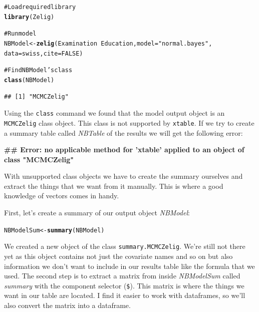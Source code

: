\documentclass[ChapterTOCs,krantz1]{krantz}\usepackage{graphicx, color}
\makeatletter
\newcommand{\hlfunctioncall}[1]{\textcolor[rgb]{0.501960784313725,0,0.329411764705882}{\textbf{#1}}}%
\newcommand{\hlstring}[1]{\textcolor[rgb]{0.6,0.6,1}{#1}}%
\newcommand{\hlcomment}[1]{\textcolor[rgb]{0.180392156862745,0.6,0.341176470588235}{#1}}%
\newenvironment{kframe}{%
 \def\at@end@of@kframe{}%
 \ifinner\ifhmode%
  \def\at@end@of@kframe{\end{minipage}}%
  \begin{minipage}{\columnwidth}%
 \fi\fi%
 \def\FrameCommand##1{\hskip\@totalleftmargin \hskip-\fboxsep
 \colorbox{shadecolor}{##1}\hskip-\fboxsep
     \hskip-\linewidth \hskip-\@totalleftmargin \hskip\columnwidth}%
 \MakeFramed {\advance\hsize-\width
   \@totalleftmargin\z@ \linewidth\hsize
   \@setminipage}}%
 {\par\unskip\endMakeFramed%
 \at@end@of@kframe}
\newenvironment{knitrout}{}{} %
\makeatother
\begin{document}
\begin{knitrout}
\color{fgcolor}\begin{kframe}
\begin{alltt}
\hlcomment{# Load required library}
\hlfunctioncall{library}(Zelig)

\hlcomment{# Run model}
NBModel <- \hlfunctioncall{zelig}(Examination ~ Education, model = \hlstring{"normal.bayes"}, 
                    data = swiss, cite = FALSE)

\hlcomment{# Find NBModel's class}
\hlfunctioncall{class}(NBModel)
\end{alltt}
\begin{verbatim}
## [1] "MCMCZelig"
\end{verbatim}
\end{kframe}
\end{knitrout}


Using the {\tt{class}} command we found that the model output object is an {\tt{MCMCZelig}} class object. This class is not supported by {\tt{xtable}}. If we try to create a summary table called {\emph{NBTable}} of the results we will get the following error:

\begin{knitrout}
\color{fgcolor}\begin{kframe}


{\ttfamily\noindent\bfseries\textcolor{errorcolor}{\#\# Error: no applicable method for 'xtable' applied to an object of class "MCMCZelig"}}\end{kframe}
\end{knitrout}


With unsupported class objects we have to create the summary ourselves and extract the things that we want from it manually. This is where a good knowledge of vectors comes in handy. 

First, let's create a summary of our output object {\emph{NBModel}}:

\begin{knitrout}
\color{fgcolor}\begin{kframe}
\begin{alltt}
NBModelSum <- \hlfunctioncall{summary}(NBModel)
\end{alltt}
\end{kframe}
\end{knitrout}


We created a new object of the class {\tt{summary.MCMCZelig}}. We're still not there yet as this object contains not just the covariate names and so on but also information we don't want to include in our results table like the formula that we used. The second step is to extract a matrix from inside {\emph{NBModelSum}} called {\emph{summary}} with the component selector ({\tt{\$}}). This matrix is where the things we want in our table are located. I find it easier to work with dataframes, so we'll also convert the matrix into a dataframe.
\end{document}

